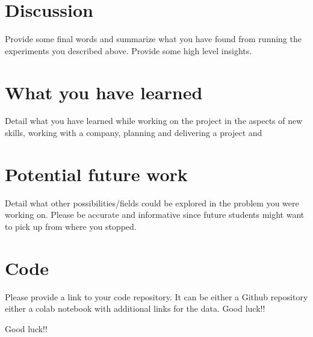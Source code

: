 \documentclass{article}
\begin{document}
\section{Discussion}
Provide some final words and summarize what you have found from running the experiments you described above. Provide some high level insights.

\section{What you have learned}
Detail what you have learned while working on the project in the aspects of new skills, working with a company, planning and delivering a project and 

\section{Potential future work}
Detail what other possibilities/fields could be explored in the problem you were working on. Please be accurate and informative since future students might want to pick up from where you stopped.

\section{Code}

Please provide a link to your code repository. It can be either a Github repository either a colab notebook with additional links for the data.
Good luck!!

Good luck!!


\end{document}
